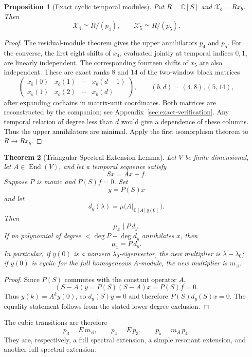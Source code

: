 \documentclass[11pt]{amsart}
\newtheorem{theorem}{Theorem}[section]
\newtheorem{proposition}[theorem]{Proposition}
\newcommand{\End}{\operatorname{End}}
\newcommand{\C}{\mathbb C}
\begin{document}
\begin{proposition}[Exact cyclic temporal modules]\label{prop:temporal-minimal}
Put $R=\C[S]$ and $\mathcal X_b=Rx_b$. Then
\[
\mathcal X_4\simeq R/(p_4),\qquad \mathcal X_5\simeq R/(p_5).
\]
\end{proposition}
\begin{proof}
The residual-module theorem gives the upper annihilators $p_4$ and $p_5$.
For the converse, the first eight shifts of $x_4$, evaluated jointly at
temporal indices $0,1$, are linearly independent. The corresponding fourteen
shifts of $x_5$ are also independent. These are exact ranks $8$ and $14$
of the two-window block matrices
\[
\begin{pmatrix}
x_b(0)&x_b(1)&\cdots&x_b(d-1)\\
x_b(1)&x_b(2)&\cdots&x_b(d)
\end{pmatrix},
\qquad (b,d)=(4,8),(5,14),
\]
after expanding cochains in matrix-unit coordinates. Both matrices are
reconstructed by the companion; see Appendix~\ref{sec:exact-verification}.
Any temporal relation of degree less than $d$ would give a dependence of
these columns. Thus the upper annihilators are minimal. Apply the first
isomorphism theorem to $R\to Rx_b$.
\end{proof}

\begin{theorem}[Triangular Spectral Extension Lemma]\label{thm:triangular-spectral-extension}
Let $V$ be finite-dimensional, let $A\in\End(V)$, and let a temporal sequence satisfy
\[
Sx=Ax+f.
\]
Suppose $P$ is monic and $P(S)f=0$.  Set
\[
y=P(S)x
\]
and let
\[
d_y(\lambda)=\mu\bigl(A|_{\C[A]y(0)}\bigr).
\]
Then
\[
\mu_x\mid P\,d_y.
\]
If no polynomial of degree $<\deg P+\deg d_y$ annihilates $x$, then
\[
\boxed{\mu_x=P\,d_y.}
\]
In particular, if $y(0)$ is a nonzero $\lambda_0$-eigenvector, the new multiplier is $\lambda-\lambda_0$; if $y(0)$ is cyclic for the full homogeneous $A$-module, the new multiplier is $m_A$.
\end{theorem}

\begin{proof}
Since $P(S)$ commutes with the constant operator $A$,
\[
(S-A)y=P(S)(S-A)x=P(S)f=0.
\]
Thus $y(k)=A^ky(0)$, so $d_y(S)y=0$ and therefore $P(S)d_y(S)x=0$.  The equality statement follows from the stated lower-degree exclusion.
\end{proof}

The cubic transitions are therefore
\[
\boxed{
p_3=E\,m_A,
\qquad
p_4=E\,p_3,
\qquad
p_5=m_A\,p_4.
}
\]
They are, respectively, a full spectral extension, a simple resonant extension, and another full spectral extension.
\end{document}
